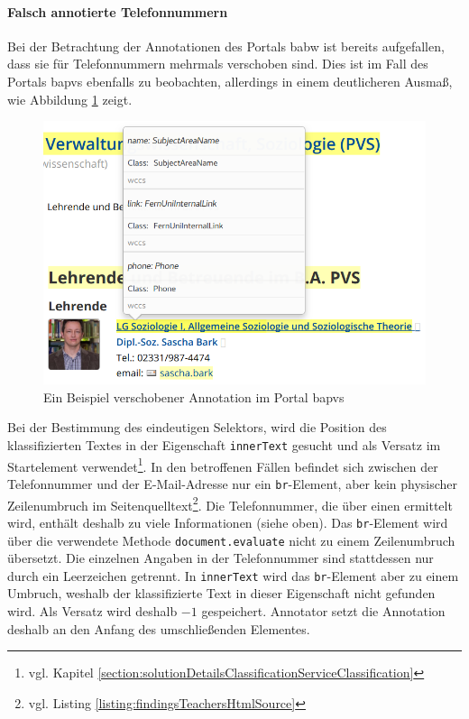     \paragraph{Falsch annotierte Telefonnummern}
    Bei der Betrachtung der Annotationen des Portals \gls{babw}
    ist bereits aufgefallen, dass sie für Telefonnummern
    mehrmals verschoben sind.
    Dies ist im Fall des Portals \gls{bapvs} ebenfalls zu beobachten,
    allerdings in einem deutlicheren Ausmaß,
    wie Abbildung \ref{image:findingTeachersBaPVSWrongPhone} zeigt.

    \begin{figure}[htb]
        \centering
        \includegraphics[scale=\screenshotScaleFactor]{../resources/findings/case-study-1/bapvs/annotations/triple-annotation.png}
        \caption{Ein Beispiel verschobener Annotation im Portal \acrshort{bapvs}}
        \label{image:findingTeachersBaPVSWrongPhone}
    \end{figure}

    Bei der Bestimmung des eindeutigen Selektors,
    wird die Position des klassifizierten Textes in der Eigenschaft
    \texttt{innerText} gesucht und als Versatz im Startelement
    verwendet\footnote{vgl. Kapitel \ref{section:solutionDetailsClassificationServiceClassification}}.
    In den betroffenen Fällen befindet sich zwischen der Telefonnummer
    und der E-Mail-Adresse nur ein \texttt{br}-Element,
    aber kein physischer Zeilenumbruch im
    Seitenquelltext\footnote{vgl. Listing \ref{listing:findingsTeachersHtmlSource}}.
    Die Telefonnummer, die über einen {\xpathSelector} ermittelt wird,
    enthält deshalb zu viele Informationen (siehe oben).
    Das \texttt{br}-Element wird über die verwendete Methode \texttt{document.evaluate} nicht zu einem Zeilenumbruch übersetzt.
    Die einzelnen Angaben in der Telefonnummer sind stattdessen nur durch ein Leerzeichen getrennt.
    In \texttt{innerText} wird das \texttt{br}-Element aber zu einem Umbruch,
    weshalb der klassifizierte Text in dieser Eigenschaft nicht gefunden wird.
    Als Versatz wird deshalb $-1$ gespeichert.
    Annotator setzt die Annotation deshalb an den Anfang des umschließenden Elementes.
